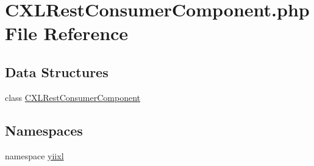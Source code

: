 \hypertarget{CXLRestConsumerComponent_8php}{
\section{CXLRestConsumerComponent.php File Reference}
\label{CXLRestConsumerComponent_8php}
}
\subsection*{Data Structures}
\begin{DoxyCompactItemize}
\item 
class \hyperlink{classCXLRestConsumerComponent}{CXLRestConsumerComponent}
\end{DoxyCompactItemize}
\subsection*{Namespaces}
\begin{DoxyCompactItemize}
\item 
namespace \hyperlink{namespaceyiixl}{yiixl}
\end{DoxyCompactItemize}

